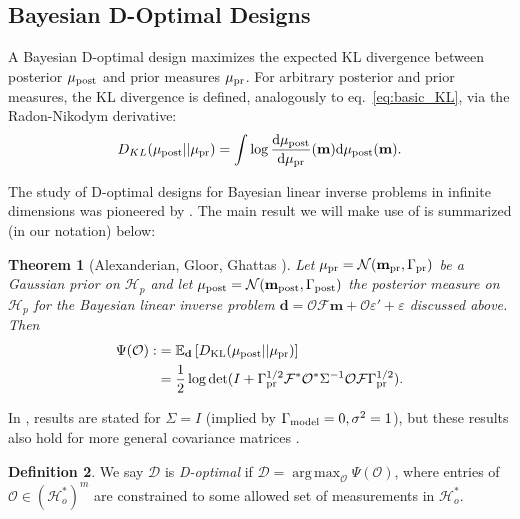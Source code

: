\documentclass[ba]{imsart}
\newcommand{\eps}{\varepsilon}
\newcommand{\der}{\text{\textup{d}}}
\newcommand{\hilp}{\mathcal{H}_p}
\newcommand{\hilo}{\mathcal{H}_o}
\newcommand{\obs}{\mathcal{O}}
\newcommand{\fwd}{\mathcal{F}}
\newcommand{\tar}{\Psi}
\DeclareMathOperator*{\argmax}{arg\,max}
\newcommand{\data}{\mathbf{d}}
\newcommand{\param}{\mathbf{m}}
\newcommand{\normal}{\mathcal{N}}
\newcommand{\pr}{\mu_{\textup{pr}}} \newcommand{\post}{\mu_{\textup{post}}} \newcommand{\prmean}{\param_{\textup{pr}}} \newcommand{\postmean}{\param_{\textup{post}}} \newcommand{\postcov}{\Gamma_{\textup{post}}} \newcommand{\prcov}{\Gamma_{\textup{pr}}} \newcommand{\modcov}{\Gamma_{\textup{model}}} \newcommand{\tmp}{\mathcal{G}}
\newcommand{\opt}{\mathcal{D}}
\theoremstyle{plain}
\newtheorem{theorem}{Theorem}
\theoremstyle{definition}
\newtheorem{definition}[theorem]{Definition}
\theoremstyle{remark}
\begin{document}
\subsection{Bayesian D-Optimal Designs}\label{subsec:D_optimal_design} 
A Bayesian D-optimal design maximizes the expected KL divergence
between posterior \(\post\) and prior measures \(\pr\). For arbitrary
posterior and prior measures, the KL divergence is defined,
analogously to eq.~\eqref{eq:basic_KL}, via the Radon-Nikodym
derivative:
\begin{equation*}
  D_{KL}(\post||\pr) = \int \log \frac{\der \post}{\der \pr}(\param) \der \post(\param).
\end{equation*}

The study of D-optimal designs for Bayesian linear inverse problems in
infinite dimensions was pioneered by \cite{AlexanderianGloorGhattas14,
  alexanderian2018efficient}. The main result we will make use of is
summarized (in our notation) below:

\begin{theorem}[Alexanderian, Gloor, Ghattas \cite{AlexanderianGloorGhattas14}]\label{thm:d_optimality}
  Let \(\pr = \normal(\prmean,\prcov)\) be a Gaussian prior on \(\hilp\)
  and let \(\post = \normal(\postmean,\postcov)\) the posterior measure
  on \(\hilp\) for the Bayesian linear inverse problem \(\data = \obs
  \fwd\param + \obs \eps' + \eps\) discussed above. Then
  \begin{align}\label{eq:objective}
    \begin{split}
      \tar( \obs) :&= \mathbb{E}_{\data}\left [ D_{\text{KL}} (\post || \pr ) \right ] \\
&= \frac12 \log \det 
      ( I + \prcov^{1/2}  \fwd ^* \obs^* \Sigma^{-1} \obs \fwd \prcov^{1/2}).
    \end{split}
  \end{align}
\end{theorem}

In \cite{AlexanderianGloorGhattas14, alexanderian2018efficient},
results are stated for \(\Sigma=I\) (implied by \(\modcov =
0,\sigma^2=1\)), but these results also hold for more general
covariance matrices \cite[p. 681]{AlexanderianGloorGhattas14}.

\begin{definition}\label{def:d_optimality}
  We say \(\opt\) is \emph{D-optimal} if \(\opt =
  \argmax_{\obs} \tar(\obs)\), where entries of \(\obs \in (\hilo^*)^m\)
  are constrained to some allowed set of measurements in \(\hilo^*\).
\end{definition}
\end{document}
